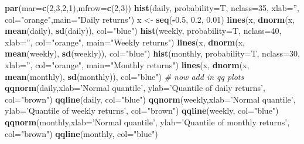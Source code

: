 \documentclass[11pt,]{article}
\newenvironment{Shaded}{\begin{snugshade}}{\end{snugshade}}
\newcommand{\CommentTok}[1]{\textcolor[rgb]{0.56,0.35,0.01}{\textit{#1}}}
\newcommand{\DataTypeTok}[1]{\textcolor[rgb]{0.13,0.29,0.53}{#1}}
\newcommand{\DecValTok}[1]{\textcolor[rgb]{0.00,0.00,0.81}{#1}}
\newcommand{\FloatTok}[1]{\textcolor[rgb]{0.00,0.00,0.81}{#1}}
\newcommand{\KeywordTok}[1]{\textcolor[rgb]{0.13,0.29,0.53}{\textbf{#1}}}
\newcommand{\NormalTok}[1]{#1}
\newcommand{\OperatorTok}[1]{\textcolor[rgb]{0.81,0.36,0.00}{\textbf{#1}}}
\newcommand{\StringTok}[1]{\textcolor[rgb]{0.31,0.60,0.02}{#1}}
\begin{document}
\begin{Shaded}
\begin{Highlighting}[]
\KeywordTok{par}\NormalTok{(}\DataTypeTok{mar=}\KeywordTok{c}\NormalTok{(}\DecValTok{2}\NormalTok{,}\DecValTok{3}\NormalTok{,}\DecValTok{2}\NormalTok{,}\DecValTok{1}\NormalTok{),}\DataTypeTok{mfrow=}\KeywordTok{c}\NormalTok{(}\DecValTok{2}\NormalTok{,}\DecValTok{3}\NormalTok{))}
\KeywordTok{hist}\NormalTok{(daily, }\DataTypeTok{probability=}\NormalTok{T, }\DataTypeTok{nclass=}\DecValTok{35}\NormalTok{, }\DataTypeTok{xlab=}\StringTok{''}\NormalTok{,}
\DataTypeTok{col=}\StringTok{"orange"}\NormalTok{,}\DataTypeTok{main=}\StringTok{"Daily returns"}\NormalTok{)}
\NormalTok{x <-}\StringTok{ }\KeywordTok{seq}\NormalTok{(}\OperatorTok{-}\FloatTok{0.5}\NormalTok{, }\FloatTok{0.2}\NormalTok{, }\FloatTok{0.01}\NormalTok{)}
\KeywordTok{lines}\NormalTok{(x, }\KeywordTok{dnorm}\NormalTok{(x, }\KeywordTok{mean}\NormalTok{(daily), }\KeywordTok{sd}\NormalTok{(daily)), }\DataTypeTok{col=}\StringTok{"blue"}\NormalTok{)}
\KeywordTok{hist}\NormalTok{(weekly, }\DataTypeTok{probability=}\NormalTok{T, }\DataTypeTok{nclass=}\DecValTok{40}\NormalTok{, }\DataTypeTok{xlab=}\StringTok{''}\NormalTok{, }\DataTypeTok{col=}\StringTok{"orange"}\NormalTok{,}
\DataTypeTok{main=}\StringTok{"Weekly returns"}\NormalTok{)}
\KeywordTok{lines}\NormalTok{(x, }\KeywordTok{dnorm}\NormalTok{(x, }\KeywordTok{mean}\NormalTok{(weekly), }\KeywordTok{sd}\NormalTok{(weekly)), }\DataTypeTok{col=}\StringTok{"blue"}\NormalTok{)}
\KeywordTok{hist}\NormalTok{(monthly, }\DataTypeTok{probability=}\NormalTok{T, }\DataTypeTok{nclass=}\DecValTok{30}\NormalTok{, }\DataTypeTok{xlab=}\StringTok{''}\NormalTok{, }\DataTypeTok{col=}\StringTok{"orange"}\NormalTok{, }\DataTypeTok{main=}\StringTok{"Monthly returns"}\NormalTok{)}
\KeywordTok{lines}\NormalTok{(x, }\KeywordTok{dnorm}\NormalTok{(x, }\KeywordTok{mean}\NormalTok{(monthly), }\KeywordTok{sd}\NormalTok{(monthly)), }\DataTypeTok{col=}\StringTok{"blue"}\NormalTok{)}
\CommentTok{# now add in qq plots}
\KeywordTok{qqnorm}\NormalTok{(daily,}\DataTypeTok{xlab=}\StringTok{'Normal quantile'}\NormalTok{, }\DataTypeTok{ylab=}\StringTok{'Quantile of daily returns'}\NormalTok{,}
\DataTypeTok{col=}\StringTok{"brown"}\NormalTok{)}
\KeywordTok{qqline}\NormalTok{(daily, }\DataTypeTok{col=}\StringTok{"blue"}\NormalTok{)}
\KeywordTok{qqnorm}\NormalTok{(weekly,}\DataTypeTok{xlab=}\StringTok{'Normal quantile'}\NormalTok{, }\DataTypeTok{ylab=}\StringTok{'Quantile of weekly returns'}\NormalTok{,}
\DataTypeTok{col=}\StringTok{"brown"}\NormalTok{)}
\KeywordTok{qqline}\NormalTok{(weekly, }\DataTypeTok{col=}\StringTok{"blue"}\NormalTok{)}
\KeywordTok{qqnorm}\NormalTok{(monthly,}\DataTypeTok{xlab=}\StringTok{'Normal quantile'}\NormalTok{, }\DataTypeTok{ylab=}\StringTok{'Quantile of monthly returns'}\NormalTok{,}
\DataTypeTok{col=}\StringTok{"brown"}\NormalTok{)}
\KeywordTok{qqline}\NormalTok{(monthly, }\DataTypeTok{col=}\StringTok{"blue"}\NormalTok{)}
\end{Highlighting}
\end{Shaded}
\end{document}
